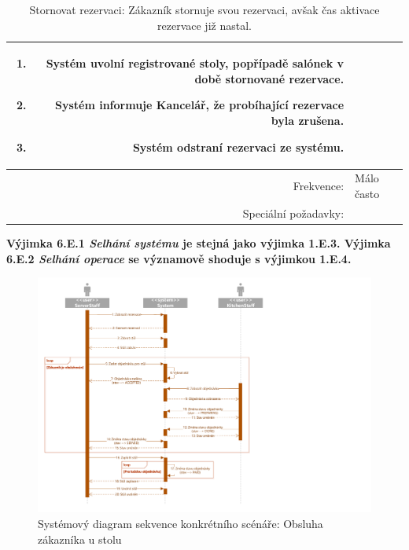 \begin{table}[ht!]
{\begin{tabular}{| r | p{12cm} |}
\begin{minipage}[t]{0.75\textwidth}
\begin{enumerate}[nosep,after=\strut]
            \item Systém uvolní registrované stoly, popřípadě salónek v době stornované rezervace.
            \item Systém informuje Kancelář, že probíhající rezervace byla zrušena.
            \item Systém odstraní rezervaci ze systému. 
    	\end{enumerate}
    \end{minipage} \\
    \hline
    Frekvence: & Málo často \\
    \hline
    Speciální požadavky: & \\  
        \hline

\end{tabular}}
\caption{Stornovat rezervaci: Zákazník stornuje svou rezervaci, avšak čas aktivace rezervace již nastal.}
\label{table:2}
\end{table}

\textbf{Výjimka 6.E.1 \textit{Selhání systému} je stejná jako výjimka 1.E.3. Výjimka 6.E.2 \textit{Selhání operace} se významově shoduje s výjimkou 1.E.4.}
\newpage


\newpage
\begin{figure}[h!]
\begin{center}
\includegraphics[scale=0.75]{../02_Vysledne_modely/04_SystemSequence.pdf}
\caption{Systémový diagram sekvence konkrétního scénáře: Obsluha zákazníka u stolu}
\label{fig:communication09-1}
\end{center}
\end{figure}


